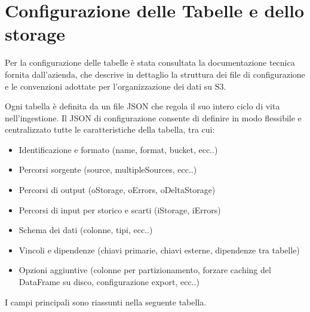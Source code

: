 \documentclass[12pt,a4paper,openright,twoside]{book}
\begin{document}
\section{Configurazione delle Tabelle e dello storage}
Per la configurazione delle tabelle è stata consultata la documentazione tecnica fornita dall'azienda, che descrive in dettaglio la struttura dei file di configurazione e le convenzioni adottate per l'organizzazione dei dati su S3.

Ogni tabella è definita da un file JSON che regola il suo intero ciclo di vita nell’ingestione. 
Il JSON di configurazione consente di definire in modo flessibile e centralizzato tutte le caratteristiche della tabella, tra cui:
\begin{itemize}
    \item Identificazione e formato (name, format, bucket, ecc..)
    \item Percorsi sorgente (source, multipleSources, ecc..)
    \item Percorsi di output (oStorage, oErrors, oDeltaStorage)
    \item Percorsi di input per storico e scarti (iStorage, iErrors)
    \item Schema dei dati (colonne, tipi, ecc..)
    \item Vincoli e dipendenze (chiavi primarie, chiavi esterne, dipendenze tra tabelle)
    \item Opzioni aggiuntive (colonne per partizionamento, forzare caching del DataFrame su disco, configurazione export, ecc..)
\end{itemize}

\newpage

I campi principali sono riassunti nella seguente tabella.
\end{document}
